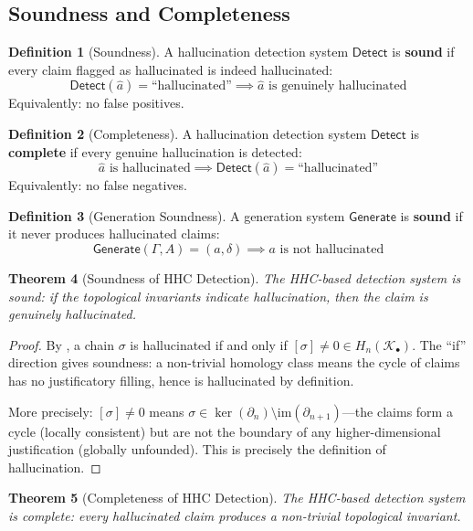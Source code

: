 \documentclass[11pt,a4paper]{article}
\theoremstyle{plain}
\newtheorem{theorem}{Theorem}[section]
\theoremstyle{definition}
\newtheorem{definition}[theorem]{Definition}
\theoremstyle{remark}
\newcommand{\im}{\mathrm{im}}
\newcommand{\Detect}{\mathsf{Detect}}
\newcommand{\Generate}{\mathsf{Generate}}
\begin{document}
\subsection{Soundness and Completeness}

\begin{definition}[Soundness]\label{def:soundness}
A hallucination detection system $\Detect$ is \textbf{sound} if every claim flagged as hallucinated is indeed hallucinated:
\[
\Detect(\hat{a}) = \text{``hallucinated''} \implies \hat{a} \text{ is genuinely hallucinated}
\]
Equivalently: no false positives.
\end{definition}

\begin{definition}[Completeness]\label{def:completeness}
A hallucination detection system $\Detect$ is \textbf{complete} if every genuine hallucination is detected:
\[
\hat{a} \text{ is hallucinated} \implies \Detect(\hat{a}) = \text{``hallucinated''}
\]
Equivalently: no false negatives.
\end{definition}

\begin{definition}[Generation Soundness]\label{def:gen-soundness}
A generation system $\Generate$ is \textbf{sound} if it never produces hallucinated claims:
\[
\Generate(\Gamma, A) = (a, \delta) \implies a \text{ is not hallucinated}
\]
\end{definition}

\begin{theorem}[Soundness of HHC Detection]\label{thm:detection-soundness}
The HHC-based detection system is sound: if the topological invariants indicate hallucination, then the claim is genuinely hallucinated.
\end{theorem}

\begin{proof}
By , a chain $\sigma$ is hallucinated if and only if $[\sigma] \neq 0 \in H_n(\mathcal{K}_\bullet)$. The ``if'' direction gives soundness: a non-trivial homology class means the cycle of claims has no justificatory filling, hence is hallucinated by definition.

More precisely: $[\sigma] \neq 0$ means $\sigma \in \ker(\partial_n) \setminus \im(\partial_{n+1})$---the claims form a cycle (locally consistent) but are not the boundary of any higher-dimensional justification (globally unfounded). This is precisely the definition of hallucination.
\end{proof}

\begin{theorem}[Completeness of HHC Detection]\label{thm:detection-completeness}
The HHC-based detection system is complete: every hallucinated claim produces a non-trivial topological invariant.
\end{theorem}
\end{document}

